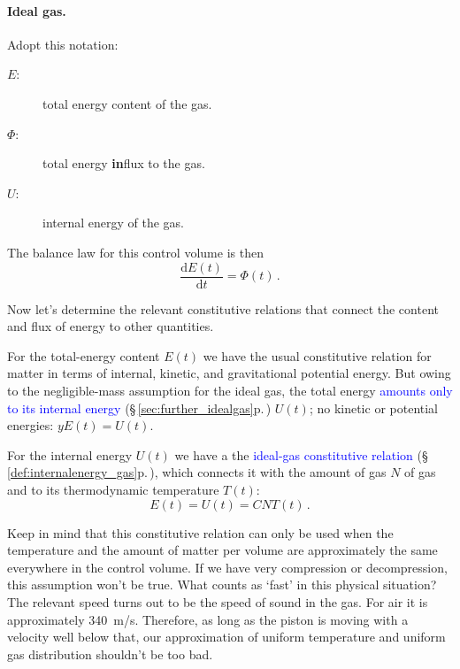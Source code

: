 \documentclass[a4paper,12pt,%
onecolumn,oneside,%
british%
]{memoir}
\newcommand*{\di}{\mathrm{d}}%
\renewcommand*{\|}[1][]{\nonscript\:#1\vert\nonscript\:\mathopen{}}
\newcommand*{\sect}{\S}%
\renewcommand*{\autoref}[3][\sect\,\ref]{\textcolor{blue}{#3} {\color{blue}\scriptsize(\faIcon[regular]{eye}\;#1{#2}\;p.\,\pageref{#2})}}
\newcommand*{\dt}{\di t}
\newcommand*{\yN}{N}
\newcommand*{\yE}{E}
\newcommand*{\yU}{U}
\newcommand*{\yH}{\varPhi}%
\newcommand*{\yT}{T}%
\begin{document}
\bigskip

\paragraph{Ideal gas.}

Adopt this notation:
\begin{description}
\item[$\yE$:] total energy content of the gas.
\item[$\yH$:] total energy \textbf{in}flux to the gas.
\item[$\yU$:] internal energy of the gas.
\end{description}
The balance law for this control volume is then
\begin{equation*}
  \frac{\di \yE(t)}{\dt} = \yH(t) \,.
\end{equation*}

Now let's determine the relevant constitutive relations that connect the content and flux of energy to other quantities.

For the total-energy content $\yE(t)$ we have the usual constitutive relation for matter in terms of internal, kinetic, and gravitational potential energy. But owing to the negligible-mass assumption for the ideal gas, the total energy
\autoref{sec:further_idealgas}{amounts only to its internal energy} $\yU(t)$; no kinetic or potential energies: $yE(t) = \yU(t)$.

For the internal energy $\yU(t)$ we have a the \autoref{def:internalenergy_gas}{ideal-gas constitutive relation}, which connects it with the amount of gas $\yN$ of gas and to its thermodynamic temperature $\yT(t)$:
\begin{equation}
  \label{eq:gas_ex_energy}
  \yE(t) = \yU(t) = C\yN\yT(t) \,.
\end{equation}
\begin{warning}
  Keep in mind that this constitutive relation can only be used when the temperature and the amount of matter per volume are approximately the same everywhere in the control volume. If we have very compression or decompression, this assumption won't be true. What counts as \enquote*{fast} in this physical situation? The relevant speed turns out to be the speed of sound in the gas. For air it is approximately \qty{340}{m/s}. Therefore, as long as the piston is moving with a velocity well below that, our approximation of uniform temperature and uniform gas distribution shouldn't be too bad.
\end{warning}
\end{document}
